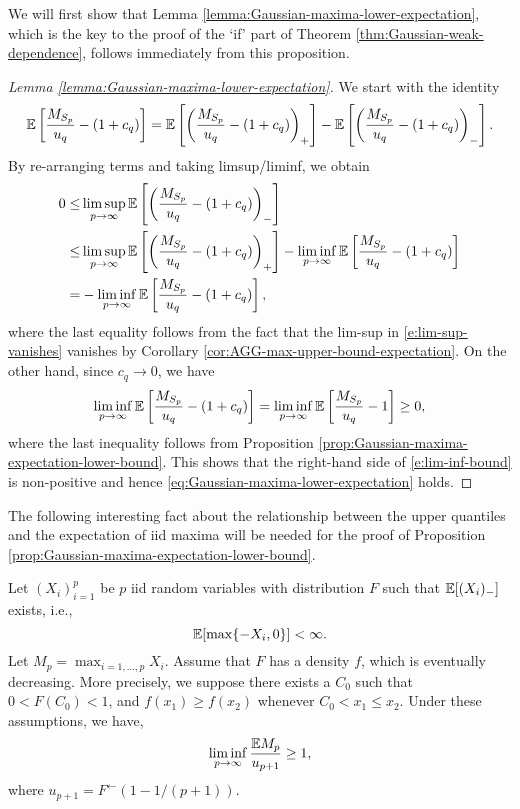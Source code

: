 We will first show that Lemma \ref{lemma:Gaussian-maxima-lower-expectation}, which is the key to the proof of the `if' part of 
Theorem \ref{thm:Gaussian-weak-dependence}, follows immediately from this proposition.

\begin{proof}[Lemma \ref{lemma:Gaussian-maxima-lower-expectation}]
We start with the identity
$$
{\mathbb E}\left[\frac{M_{S_p}}{u_q}-(1+c_q)\right] = {\mathbb E}\left[\left(\frac{M_{S_p}}{u_q}-(1+c_q)\right)_+\right] - {\mathbb E}\left[\left(\frac{M_{S_p}}{u_q}-(1+c_q)\right)_-\right].
$$
By re-arranging terms and taking limsup/liminf, we obtain
\begin{align} \label{e:lim-sup-vanishes}
    0 \le &\limsup_{p\to\infty}{\mathbb E}\left[\left(\frac{M_{S_p}}{u_q}-(1+c_q)\right)_-\right]\nonumber \\
        \le & \limsup_{p\to\infty}{\mathbb E}\left[\left(\frac{M_{S_p}}{u_q}-(1+c_q)\right)_+\right] - \liminf_{p\to\infty}{\mathbb E}\left[\frac{M_{S_p}}{u_q}-(1+c_q)\right]\\
        = & - \liminf_{p\to\infty}{\mathbb E}\left[\frac{M_{S_p}}{u_q}-(1+c_q)\right],
        \label{e:lim-inf-bound}
\end{align}
where the last equality follows from the fact that the lim-sup in \eqref{e:lim-sup-vanishes} vanishes by Corollary \ref{cor:AGG-max-upper-bound-expectation}.
On the other hand, since $c_q\to 0$, we have
$$
\liminf_{p\to\infty}{\mathbb E}\left[\frac{M_{S_p}}{u_q}-(1+c_q)\right] 
= \liminf_{p\to\infty}{\mathbb E}\left[\frac{M_{S_p}}{u_q}-1\right] \ge 0,
$$
where the last inequality follows from Proposition \ref{prop:Gaussian-maxima-expectation-lower-bound}.  This shows that 
the right-hand side of \eqref{e:lim-inf-bound} is non-positive and hence
\eqref{eq:Gaussian-maxima-lower-expectation} holds. 
\end{proof}

The following interesting fact about the relationship between the upper quantiles and the expectation of iid maxima will be needed for the 
proof of  Proposition \ref{prop:Gaussian-maxima-expectation-lower-bound}.

\begin{lemma} \label{lemma:expectation-lower}
Let $(X_i)_{i=1}^p$ be $p$ iid random variables with distribution $F$ such that ${\mathbb E}[(X_i)_-]$ exists, i.e.,
$$
{\mathbb E}[\max\{-X_i, 0\}] < \infty.
$$
Let $M_p = \max_{i=1,\ldots,p}X_i$. Assume that $F$ has a density $f$, which is eventually decreasing. 
More precisely, we suppose there exists a 
$C_0$ such that $0<F(C_0)<1$, and $f(x_1) \ge f(x_2)$ whenever $C_0 < x_1 \le x_2$. 
Under these assumptions, we have,
$$
\liminf_{p\to\infty}\frac{{\mathbb E} M_p}{u_{p+1}} \ge 1,
$$
where $u_{p+1} = F^{\leftarrow}(1 - 1/(p+1))$.
\end{lemma}


